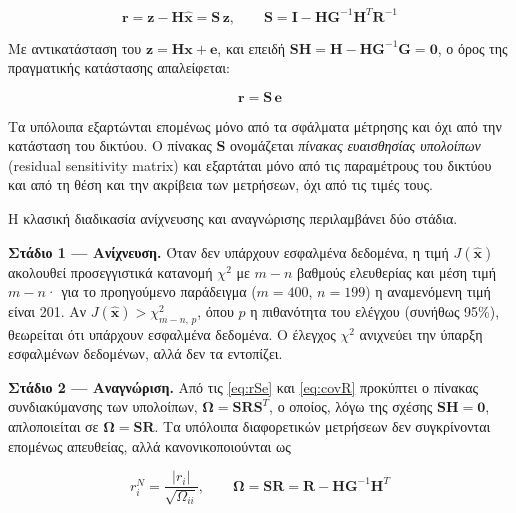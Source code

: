 \begin{equation}
\mathbf{r} = \mathbf{z} - \mathbf{H}\hat{\mathbf{x}} = \mathbf{S}\,\mathbf{z}, \qquad
\mathbf{S} = \mathbf{I} - \mathbf{H}\mathbf{G}^{-1}\mathbf{H}^{T}\mathbf{R}^{-1}
\label{eq:resS}
\end{equation}

Με αντικατάσταση του $\mathbf{z} = \mathbf{H}\mathbf{x} + \mathbf{e}$, και επειδή
$\mathbf{S}\mathbf{H} = \mathbf{H} - \mathbf{H}\mathbf{G}^{-1}\mathbf{G} = \mathbf{0}$, ο όρος
της πραγματικής κατάστασης απαλείφεται:

\begin{equation}
\mathbf{r} = \mathbf{S}\,\mathbf{e}
\label{eq:rSe}
\end{equation}

Τα υπόλοιπα εξαρτώνται επομένως μόνο από τα σφάλματα μέτρησης και όχι από την κατάσταση του
δικτύου. Ο πίνακας $\mathbf{S}$ ονομάζεται \emph{πίνακας ευαισθησίας υπολοίπων} (residual
sensitivity matrix) και εξαρτάται μόνο από τις παραμέτρους του δικτύου και από τη θέση και την
ακρίβεια των μετρήσεων, όχι από τις τιμές τους.

Η κλασική διαδικασία ανίχνευσης και αναγνώρισης περιλαμβάνει δύο στάδια.

\textbf{Στάδιο 1 --- Ανίχνευση.} Όταν δεν υπάρχουν εσφαλμένα δεδομένα, η τιμή
$J(\hat{\mathbf{x}})$ ακολουθεί προσεγγιστικά κατανομή $\chi^2$ με $m-n$ βαθμούς ελευθερίας
και μέση τιμή $m-n$· για το προηγούμενο παράδειγμα ($m = 400$, $n = 199$) η αναμενόμενη τιμή
είναι 201. Αν $J(\hat{\mathbf{x}}) > \chi^2_{m-n,\,p}$, όπου $p$ η πιθανότητα του ελέγχου
(συνήθως 95\%), θεωρείται ότι υπάρχουν εσφαλμένα δεδομένα. Ο έλεγχος $\chi^2$ ανιχνεύει την
ύπαρξη εσφαλμένων δεδομένων, αλλά δεν τα εντοπίζει.

\textbf{Στάδιο 2 --- Αναγνώριση.} Από τις \eqref{eq:rSe} και \eqref{eq:covR} προκύπτει ο
πίνακας συνδιακύμανσης των υπολοίπων, $\boldsymbol{\Omega} = \mathbf{S}\mathbf{R}\mathbf{S}^{T}$,
ο οποίος, λόγω της σχέσης $\mathbf{S}\mathbf{H} = \mathbf{0}$, απλοποιείται σε
$\boldsymbol{\Omega} = \mathbf{S}\mathbf{R}$. Τα υπόλοιπα διαφορετικών μετρήσεων δεν συγκρίνονται επομένως απευθείας, αλλά
κανονικοποιούνται ως

\begin{equation}
r_i^{N} = \frac{|r_i|}{\sqrt{\Omega_{ii}}}, \qquad
\boldsymbol{\Omega} = \mathbf{S}\mathbf{R} = \mathbf{R} - \mathbf{H}\mathbf{G}^{-1}\mathbf{H}^{T}
\label{eq:normres}
\end{equation}

